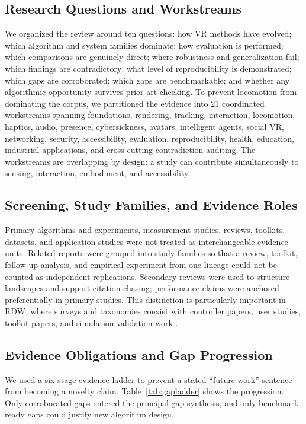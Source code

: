 \subsection{Research Questions and Workstreams}
We organized the review around ten questions: how VR methods have evolved; which algorithm and system families dominate; how evaluation is performed; which comparisons are genuinely direct; where robustness and generalization fail; which findings are contradictory; what level of reproducibility is demonstrated; which gaps are corroborated; which gaps are benchmarkable; and whether any algorithmic opportunity survives prior-art checking. To prevent locomotion from dominating the corpus, we partitioned the evidence into 21 coordinated workstreams spanning foundations, rendering, tracking, interaction, locomotion, haptics, audio, presence, cybersickness, avatars, intelligent agents, social VR, networking, security, accessibility, evaluation, reproducibility, health, education, industrial applications, and cross-cutting contradiction auditing. The workstreams are overlapping by design: a study can contribute simultaneously to sensing, interaction, embodiment, and accessibility.

\subsection{Screening, Study Families, and Evidence Roles}
Primary algorithms and experiments, measurement studies, reviews, toolkits, datasets, and application studies were not treated as interchangeable evidence units. Related reports were grouped into study families so that a review, toolkit, follow-up analysis, and empirical experiment from one lineage could not be counted as independent replications. Secondary reviews were used to structure landscapes and support citation chasing; performance claims were anchored preferentially in primary studies. This distinction is particularly important in RDW, where surveys and taxonomies coexist with controller papers, user studies, toolkit papers, and simulation-validation work \cite{Nilsson2018FifteenYears,Suma2012Taxonomy,Prinz2023Taxonomies,Azmandian2016RDWToolkit,Azmandian2022SimulationValidation}.

\subsection{Evidence Obligations and Gap Progression}
We used a six-stage evidence ladder to prevent a stated ``future work'' sentence from becoming a novelty claim. Table~\ref{tab:gapladder} shows the progression. Only corroborated gaps entered the principal gap synthesis, and only benchmark-ready gaps could justify new algorithm design.

